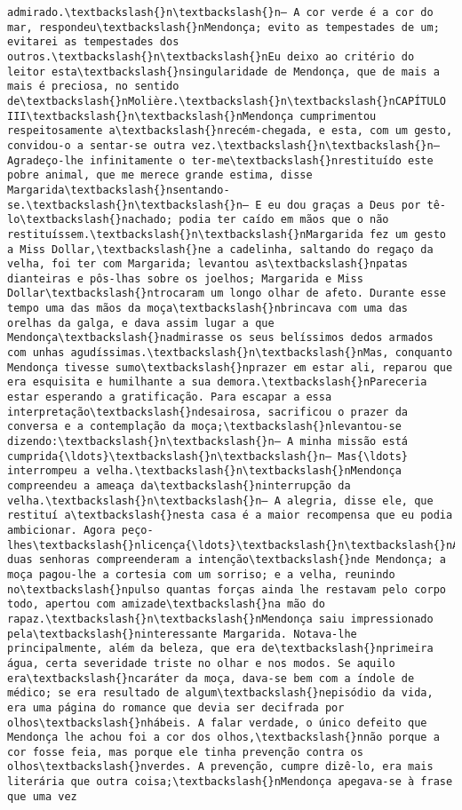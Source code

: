 \begin{Verbatim}[commandchars=\\\{\}]
admirado.\textbackslash{}n\textbackslash{}n— A cor verde é a cor do mar, respondeu\textbackslash{}nMendonça; evito as tempestades de um; evitarei as tempestades dos outros.\textbackslash{}n\textbackslash{}nEu deixo ao critério do leitor esta\textbackslash{}nsingularidade de Mendonça, que de mais a mais é preciosa, no sentido de\textbackslash{}nMolière.\textbackslash{}n\textbackslash{}nCAPÍTULO III\textbackslash{}n\textbackslash{}nMendonça cumprimentou respeitosamente a\textbackslash{}nrecém-chegada, e esta, com um gesto, convidou-o a sentar-se outra vez.\textbackslash{}n\textbackslash{}n— Agradeço-lhe infinitamente o ter-me\textbackslash{}nrestituído este pobre animal, que me merece grande estima, disse Margarida\textbackslash{}nsentando-se.\textbackslash{}n\textbackslash{}n— E eu dou graças a Deus por tê-lo\textbackslash{}nachado; podia ter caído em mãos que o não restituíssem.\textbackslash{}n\textbackslash{}nMargarida fez um gesto a Miss Dollar,\textbackslash{}ne a cadelinha, saltando do regaço da velha, foi ter com Margarida; levantou as\textbackslash{}npatas dianteiras e pôs-lhas sobre os joelhos; Margarida e Miss Dollar\textbackslash{}ntrocaram um longo olhar de afeto. Durante esse tempo uma das mãos da moça\textbackslash{}nbrincava com uma das orelhas da galga, e dava assim lugar a que Mendonça\textbackslash{}nadmirasse os seus belíssimos dedos armados com unhas agudíssimas.\textbackslash{}n\textbackslash{}nMas, conquanto Mendonça tivesse sumo\textbackslash{}nprazer em estar ali, reparou que era esquisita e humilhante a sua demora.\textbackslash{}nPareceria estar esperando a gratificação. Para escapar a essa interpretação\textbackslash{}ndesairosa, sacrificou o prazer da conversa e a contemplação da moça;\textbackslash{}nlevantou-se dizendo:\textbackslash{}n\textbackslash{}n— A minha missão está cumprida{\ldots}\textbackslash{}n\textbackslash{}n— Mas{\ldots} interrompeu a velha.\textbackslash{}n\textbackslash{}nMendonça compreendeu a ameaça da\textbackslash{}ninterrupção da velha.\textbackslash{}n\textbackslash{}n— A alegria, disse ele, que restituí a\textbackslash{}nesta casa é a maior recompensa que eu podia ambicionar. Agora peço-lhes\textbackslash{}nlicença{\ldots}\textbackslash{}n\textbackslash{}nAs duas senhoras compreenderam a intenção\textbackslash{}nde Mendonça; a moça pagou-lhe a cortesia com um sorriso; e a velha, reunindo no\textbackslash{}npulso quantas forças ainda lhe restavam pelo corpo todo, apertou com amizade\textbackslash{}na mão do rapaz.\textbackslash{}n\textbackslash{}nMendonça saiu impressionado pela\textbackslash{}ninteressante Margarida. Notava-lhe principalmente, além da beleza, que era de\textbackslash{}nprimeira água, certa severidade triste no olhar e nos modos. Se aquilo era\textbackslash{}ncaráter da moça, dava-se bem com a índole de médico; se era resultado de algum\textbackslash{}nepisódio da vida, era uma página do romance que devia ser decifrada por olhos\textbackslash{}nhábeis. A falar verdade, o único defeito que Mendonça lhe achou foi a cor dos olhos,\textbackslash{}nnão porque a cor fosse feia, mas porque ele tinha prevenção contra os olhos\textbackslash{}nverdes. A prevenção, cumpre dizê-lo, era mais literária que outra coisa;\textbackslash{}nMendonça apegava-se à frase que uma vez 
\end{Verbatim}

